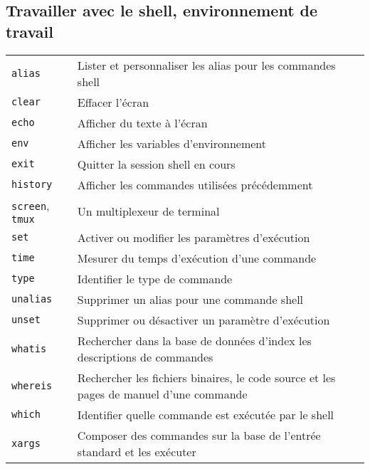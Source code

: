 \documentclass[10pt,a4paper]{article}
\begin{document}
\begin{multicols}{2}
\section{Travailler avec le shell, environnement de travail}
\begin{tabular}{ p{2.5cm} p{8.5cm} }
  \hline
  \texttt{alias} & Lister et personnaliser les alias pour les commandes shell \\
  \rowcolor{Gray}
  \texttt{clear} & Effacer l'écran \\
  \texttt{echo} & Afficher du texte à l'écran \\
  \rowcolor{Gray}
  \texttt{env} & Afficher les variables d'environnement \\
  \texttt{exit} & Quitter la session shell en cours \\
  \rowcolor{Gray}
  \texttt{history} & Afficher les commandes utilisées précédemment \\
  \texttt{screen}, \texttt{tmux} & Un multiplexeur de terminal \\
  \rowcolor{Gray}
  \texttt{set} & Activer ou modifier les paramètres d'exécution \\
  \texttt{time} & Mesurer du temps d'exécution d'une commande \\
  \rowcolor{Gray}
  \texttt{type} & Identifier le type de commande \\
  \texttt{unalias} & Supprimer un alias pour une commande shell \\
  \rowcolor{Gray}
  \texttt{unset} & Supprimer ou désactiver un paramètre d'exécution \\
  \texttt{whatis} & Rechercher dans la base de données d'index les descriptions de commandes \\
  \rowcolor{Gray}
  \texttt{whereis} & Rechercher les fichiers binaires, le code source et les pages de manuel d'une commande \\
  \texttt{which} & Identifier quelle commande est exécutée par le shell\\
  \rowcolor{Gray}
  \texttt{xargs} & Composer des commandes sur la base de l'entrée standard et les exécuter\\
  \hline
\end{tabular}



\end{multicols}
\end{document}
